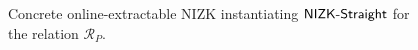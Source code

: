 \begin{figure}[H]
\begin{framed}
\begin{center}
    \end{center}
  \end{framed}
    \caption{Concrete online-extractable NIZK instantiating $\mathsf{NIZK}\hbox{-}{\mathsf{Straight}}$ for the
    relation $\mathcal{R}_P$.}
  \label{fg:concrete-simulator}
\end{figure}
